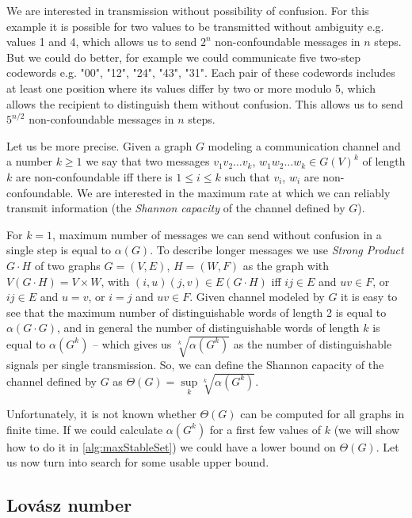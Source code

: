 We are interested in transmission without possibility of confusion. For this example it is possible for two values to be transmitted without ambiguity e.g. values 1 and 4, which allows us to send $2^n$ non-confoundable messages in $n$ steps. But we could do better, for example we could communicate five two-step codewords e.g. "00", "12", "24", "43", "31". Each pair of these codewords includes at least one position where its values differ by two or more modulo 5, which allows the recipient to distinguish them without confusion.  This allows us to send $5^{n / 2}$ non-confoundable messages in $n$ steps.

Let us be more precise. Given a graph $G$ modeling a communication channel and a number $k \geq 1$ we say that two messages $v_1v_2\ldots v_k$, $w_1w_2\ldots w_k \in G(V)^k$ of length $k$ are non-confoundable iff there is $1 \leq i \leq k$ such that $v_i$, $w_i$ are non-confoundable. We are interested in the maximum rate at which we can reliably transmit information (the \emph{Shannon capacity} of the channel defined by $G$).

For $k = 1$, maximum number of messages we can send without confusion in a single step is equal to $\alpha(G)$. To describe longer messages we use \emph{Strong Product} $G \cdot H$ of two graphs $G = (V, E)$, $H = (W, F)$ as the graph with $V(G \cdot H) = V \times W$, with $(i, u)(j, v) \in E(G \cdot H)$ iff $ij \in E$ and $uv \in F$, or $ij \in E$ and $u = v$, or $i = j$ and $uv \in F$. Given channel modeled by $G$ it is easy to see that the maximum number of distinguishable words of length 2 is equal to $\alpha(G \cdot G)$, and in general the number of distinguishable words of length $k$ is equal to $\alpha(G^k)$ -- which gives us $\sqrt[k]{\alpha(G^k)}$ as the number of distinguishable signals per single transmission. So, we can define the Shannon capacity of the channel defined by $G$ as $\Theta(G) = \sup\limits_k \sqrt[k]{\alpha(G^k)}$.

Unfortunately, it is not known whether $\Theta(G)$ can be computed for all graphs in finite time. If we could calculate $\alpha(G^k)$ for a first few values of $k$ (we will show how to do it in \cref{alg:maxStableSet}) we could have a lower bound on $\Theta(G)$. Let us now turn into search for some usable upper bound.

\subsection{Lovász number}

